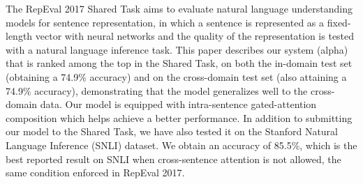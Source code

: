 The RepEval 2017 Shared Task aims to evaluate natural language understanding models for sentence representation, in which a sentence is represented as a fixed-length vector with neural networks and the quality of the representation is tested with a natural language inference task. This paper describes our system (alpha) that is ranked among the top in the Shared Task, on both the in-domain test set (obtaining a 74.9\% accuracy) and on the cross-domain test set (also attaining a 74.9\% accuracy), demonstrating that the model generalizes well to the cross-domain data. Our model is equipped with intra-sentence gated-attention composition which helps achieve a better performance. In addition to submitting our model to the Shared Task, we have also tested it on the Stanford Natural Language Inference (SNLI) dataset. We obtain an accuracy of 85.5\%, which is the best reported result on SNLI when cross-sentence attention is not allowed, the same condition enforced in RepEval 2017.

